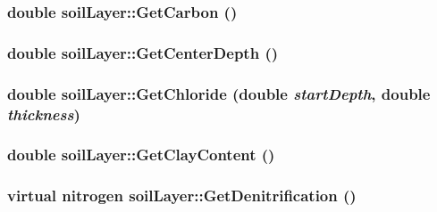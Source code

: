 \label{classsoil_layer_aadce28fdd5d1a819981785e6f4954674}
\hypertarget{classsoil_layer_a6fe7e84c83e345c297bc55cae7f36acc}{
\subsubsection[{GetCarbon}]{\setlength{\rightskip}{0pt plus 5cm}double soilLayer::GetCarbon ()}}
\label{classsoil_layer_a6fe7e84c83e345c297bc55cae7f36acc}
\hypertarget{classsoil_layer_a1789c88edae9f3ef01bc1b321bc71913}{
\subsubsection[{GetCenterDepth}]{\setlength{\rightskip}{0pt plus 5cm}double soilLayer::GetCenterDepth ()}}
\label{classsoil_layer_a1789c88edae9f3ef01bc1b321bc71913}
\hypertarget{classsoil_layer_ad3683d88ec613da7fd985169287c1553}{
\subsubsection[{GetChloride}]{\setlength{\rightskip}{0pt plus 5cm}double soilLayer::GetChloride (double {\em startDepth}, \/  double {\em thickness})}}
\label{classsoil_layer_ad3683d88ec613da7fd985169287c1553}
\hypertarget{classsoil_layer_a75861976e9ef03938056de1307b11711}{
\subsubsection[{GetClayContent}]{\setlength{\rightskip}{0pt plus 5cm}double soilLayer::GetClayContent ()}}
\label{classsoil_layer_a75861976e9ef03938056de1307b11711}
\hypertarget{classsoil_layer_a65c071c06b636ea34ba54ea59d00d2ae}{
\subsubsection[{GetDenitrification}]{\setlength{\rightskip}{0pt plus 5cm}virtual {\bf nitrogen} soilLayer::GetDenitrification ()}}
